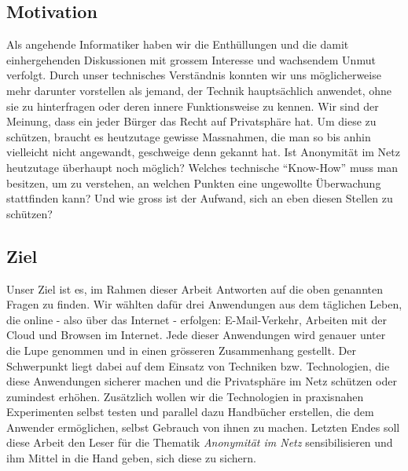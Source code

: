 \subsection{Motivation}
Als angehende Informatiker haben wir die Enthüllungen und die damit einhergehenden Diskussionen mit grossem Interesse und wachsendem Unmut verfolgt. Durch unser technisches Verständnis konnten wir uns möglicherweise mehr darunter vorstellen als jemand, der Technik hauptsächlich anwendet, ohne sie zu hinterfragen oder deren innere Funktionsweise zu kennen. Wir sind der Meinung, dass ein jeder Bürger das Recht auf Privatsphäre hat. Um diese zu schützen, braucht es heutzutage gewisse Massnahmen, die man so bis anhin vielleicht nicht angewandt, geschweige denn gekannt hat. Ist Anonymität im Netz heutzutage überhaupt noch möglich? Welches technische ``Know-How'' muss man besitzen, um zu verstehen, an welchen Punkten eine ungewollte Überwachung stattfinden kann? Und wie gross ist der Aufwand, sich an eben diesen Stellen zu schützen?

\subsection{Ziel}
Unser Ziel ist es, im Rahmen dieser Arbeit Antworten auf die oben genannten Fragen zu finden. Wir wählten dafür drei Anwendungen aus dem täglichen Leben, die online - also über das Internet - erfolgen: E-Mail-Verkehr, Arbeiten mit der Cloud und Browsen im Internet. Jede dieser Anwendungen wird genauer unter die Lupe genommen und in einen grösseren Zusammenhang gestellt. Der Schwerpunkt liegt dabei auf dem Einsatz von Techniken bzw. Technologien, die diese Anwendungen sicherer machen und die Privatsphäre im Netz schützen oder zumindest erhöhen. Zusätzlich wollen wir die Technologien in praxisnahen Experimenten selbst testen und parallel dazu Handbücher erstellen, die dem Anwender ermöglichen, selbst Gebrauch von ihnen zu machen. Letzten Endes soll diese Arbeit den Leser für die Thematik \textit{Anonymität im Netz} sensibilisieren und ihm Mittel in die Hand geben, sich diese zu sichern.

